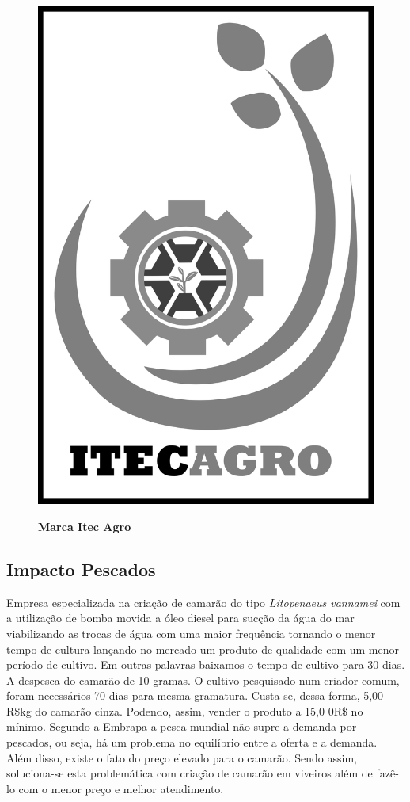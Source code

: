 \begin{figure}[!htb]
\centering
\caption{\textbf{Marca Itec Agro}}
\includegraphics[scale=0.05]{Imagens/itecagro.png}
\label{figura_46}
\end{figure}
\newpage


\subsection{Impacto Pescados}

Empresa especializada na criação de camarão do tipo \textit{Litopenaeus vannamei} com a utilização de bomba movida a óleo diesel para sucção da água do mar viabilizando as trocas de água com uma maior frequência tornando o menor tempo de cultura lançando no mercado um produto de qualidade com um menor período de cultivo. Em outras palavras baixamos o tempo de cultivo para 30 dias. A despesca do camarão de 10 gramas. O cultivo pesquisado num criador comum, foram necessários 70 dias para mesma gramatura. Custa-se, dessa forma, 5,00 R\$kg do camarão cinza. Podendo, assim, vender o produto a 15,0 0R\$ no mínimo. Segundo a Embrapa a pesca mundial não supre a demanda por pescados, ou seja, há um problema no equilíbrio entre a oferta e a demanda. Além disso, existe o fato do preço elevado para o camarão. Sendo assim, soluciona-se esta problemática com criação de camarão em viveiros além de fazê-lo com o menor preço e melhor atendimento.

